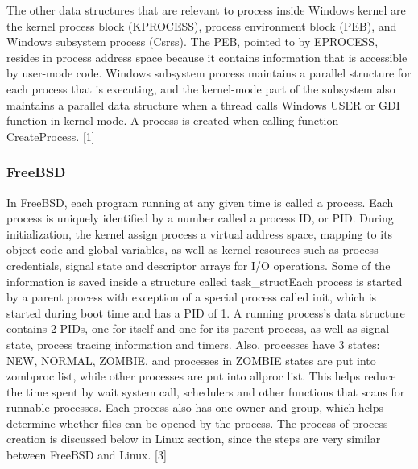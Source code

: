 \documentclass[10pt,a4paper]{article}
\begin{document}
The other data structures that are relevant to process inside Windows kernel are the kernel process block (KPROCESS), process environment block (PEB), and Windows subsystem process (Csrss). The PEB, pointed to by EPROCESS, resides in process address space because it contains information that is accessible by user-mode code. Windows subsystem process maintains a parallel structure for each process that is executing, and the kernel-mode part of the subsystem also maintains a parallel data structure when a thread calls Windows USER or GDI function in kernel mode. A process is created when calling function CreateProcess. [1]

\subsubsection{FreeBSD}
In FreeBSD, each program running at any given time is called a process. Each process is uniquely identified by a number called a process ID, or PID. During initialization, the kernel assign process a virtual address space, mapping to its object code and global variables, as well as kernel resources such as process credentials, signal state and descriptor arrays for I/O operations. Some of the information is saved inside a structure called task\_structEach process is started by a parent process with exception of a special process called init, which is started during boot time and has a PID of 1. A running process’s data structure contains 2 PIDs, one for itself and one for its parent process, as well as signal state, process tracing information and timers. Also, processes have 3 states: NEW, NORMAL, ZOMBIE, and processes in ZOMBIE states are put into zombproc list, while other processes are put into allproc list. This helps reduce the time spent by wait system call, schedulers and other functions that scans for runnable processes. Each process also has one owner and group, which helps determine whether files can be opened by the process. The process of process creation is discussed below in Linux section, since the steps are very similar between FreeBSD and Linux. [3]
\end{document}
